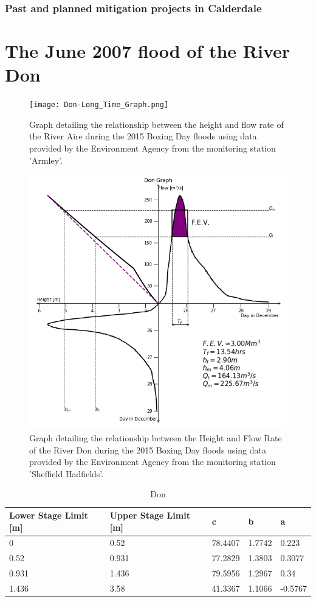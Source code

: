 \documentclass[11pt,a4paper]{article}
\begin{document}
\subsubsection{Past and planned mitigation projects in Calderdale}


\section{The June 2007 flood of the River Don}
\begin{figure}[H]
\begin{center}
\texttt{[image: Don-Long\_Time\_Graph.png]}
\caption{Graph detailing the relationship between the height and flow rate of the River Aire during the 2015 Boxing Day floods using data provided by the Environment Agency from the monitoring station 'Armley'.}
\end{center}
\end{figure}
\begin{figure}[H]
\begin{center}
\includegraphics[scale=0.45]{Don-Quadrant_Graph.png}
\caption{Graph detailing the relationship between the Height and Flow Rate of the River Don during the 2015 Boxing Day floods using data provided by the Environment Agency from the monitoring station 'Sheffield Hadfields'.}
\end{center}
\end{figure}
\begin{table}[H]
\centering
\begin{tabular}{|l|l|l|l|l|}
\hline
Lower Stage Limit {[}m{]} & Upper Stage Limit {[}m{]} & c & b & a \\
\hline
0 & 0.52 & 78.4407 & 1.7742 & 0.223 \\
0.52 & 0.931 & 77.2829 & 1.3803 & 0.3077 \\
0.931 & 1.436 & 79.5956 & 1.2967 & 0.34 \\
1.436 & 3.58 & 41.3367 & 1.1066 & -0.5767 \\
\hline
\end{tabular}
\caption{Don}
\end{table}
\end{document}
